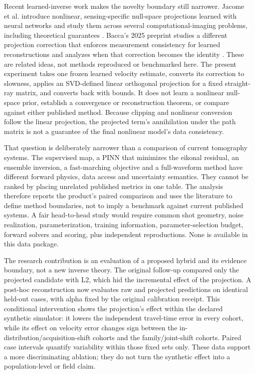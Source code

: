 \documentclass[11pt]{article}
\begin{document}
Recent learned-inverse work makes the novelty boundary still narrower. Jacome et al. introduce nonlinear, sensing-specific null-space projections learned with neural networks and study them across several computational-imaging problems, including theoretical guarantees \cite{jacome_npn_2025}. Bacca's 2025 preprint studies a different projection correction that enforces measurement consistency for learned reconstructions and analyzes when that correction becomes the identity \cite{bacca_projection_2025}. These are related ideas, not methods reproduced or benchmarked here. The present experiment takes one frozen learned velocity estimate, converts its correction to slowness, applies an SVD-defined linear orthogonal projection for a fixed straight-ray matrix, and converts back with bounds. It does not learn a nonlinear null-space prior, establish a convergence or reconstruction theorem, or compare against either published method. Because clipping and nonlinear conversion follow the linear projection, the projected term's annihilation under the path matrix is not a guarantee of the final nonlinear model's data consistency.

That question is deliberately narrower than a comparison of current tomography systems. The supervised map, a PINN that minimizes the eikonal residual, an ensemble inversion, a fast-marching objective and a full-waveform method have different forward physics, data access and uncertainty semantics. They cannot be ranked by placing unrelated published metrics in one table. The analysis therefore reports the product's paired comparison and uses the literature to define method boundaries, not to imply a benchmark against current published systems. A fair head-to-head study would require common shot geometry, noise realization, parameterization, training information, parameter-selection budget, forward solvers and scoring, plus independent reproductions. None is available in this data package.

The research contribution is an evaluation of a proposed hybrid and its evidence boundary, not a new inverse theory. The original follow-up compared only the projected candidate with L2, which hid the incremental effect of the projection. A post-hoc reconstruction now evaluates raw and projected predictions on identical held-out cases, with alpha fixed by the original calibration receipt. This conditional intervention shows the projection's effect within the declared synthetic simulator: it lowers the independent travel-time error in every cohort, while its effect on velocity error changes sign between the in-distribution/acquisition-shift cohorts and the family/joint-shift cohorts. Paired case intervals quantify variability within those fixed sets only. These data support a more discriminating ablation; they do not turn the synthetic effect into a population-level or field claim.
\end{document}
